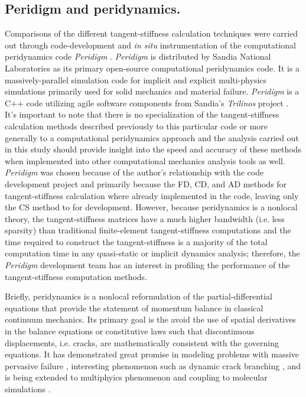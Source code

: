 \documentclass[preprint,12pt]{elsarticle}
\begin{document}
\subsection{Peridigm and  peridynamics.}
%
Comparisons of the different tangent-stiffness calculation techniques were carried out through code-development and \emph{in situ} instrumentation of the computational peridynamics code \emph{Peridigm} \cite{peridigm}. \emph{Peridigm} is distributed by Sandia National Laboratories as its primary open-source computational peridynamics code. It is a massively-parallel simulation code for implicit and explicit multi-physics simulations primarily used for solid mechanics and material failure. \emph{Peridigm} is a C++ code utilizing agile software components from Sandia's  \emph{Trilinos} project \cite{trilinos}. It's important to note that there is no specialization of the tangent-stiffness calculation methods described previously to this particular code or more generally to a computational peridynamics approach and the analysis carried out in this study should provide insight into the speed and accuracy of these methods when implemented into other computational mechanics analysis tools as well.  \emph{Peridigm} was chosen because of the author's relationship with the code development project and primarily because the FD, CD, and AD methods for tangent-stiffness calculation where already implemented in the code, leaving only the CS method to for development. However, because peridynamics is a nonlocal theory, the tangent-stiffness matrices have a much higher bandwidth (i.e. less sparsity) than traditional finite-element tangent-stiffness computations and the time required to construct the tangent-stiffness is a majority of the total computation time in any quasi-static or implicit dynamics analysis; therefore, the \emph{Peridigm} development team has an interest in profiling the performance of the tangent-stiffness computation methods.

Briefly, peridynamics \cite{silling2000ret, silling:psa, silling2010peridynamic} is a nonlocal reformulation of the partial-differential equations that provide the statement of momentum balance in classical continuum mechanics. Its primary goal is the avoid the use of spatial derivatives in the balance equations or constitutive laws such that discontinuous displacements, i.e. cracks, are mathematically consistent with the governing equations. It has demonstrated great promise in modeling problems with massive pervasive failure \cite{littlewood2010}, interesting phenomenon such as dynamic crack branching \cite{ha2010sod}, and is being extended to multiphyics phenomenon \cite{bobaru2011peridynamic,katiyar2013} and coupling to molecular simulations \cite{seleson2009peridynamics}.
\end{document}
